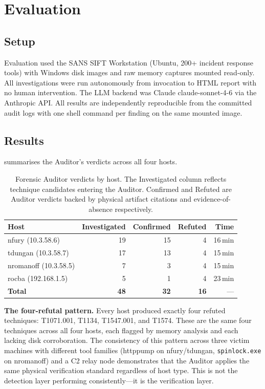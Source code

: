 \documentclass[sigconf, nonacm]{acmart}
\begin{document}
\section{Evaluation}
\label{sec:evaluation}

\subsection{Setup}

Evaluation used the SANS SIFT Workstation (Ubuntu, 200+ incident response tools)
with Windows disk images and raw memory captures mounted read-only. All
investigations were run autonomously from invocation to HTML report with no human
intervention. The LLM backend was Claude claude-sonnet-4-6 via the Anthropic API.
All results are independently reproducible from the committed audit logs with one
shell command per finding on the same mounted image.

\subsection{Results}

 summarises the Auditor's verdicts across all four hosts.

\begin{table}[h]
\centering
\caption{Forensic Auditor verdicts by host. The Investigated column reflects
technique candidates entering the Auditor. Confirmed and Refuted are Auditor
verdicts backed by physical artifact citations and evidence-of-absence
respectively.}
\label{tab:results}
\begin{tabular}{lrrrr}
\toprule
Host & Investigated & Confirmed & Refuted & Time \\
\midrule
nfury (10.3.58.6)     & 19 & 15 & 4 & 16\,min \\
tdungan (10.3.58.7)   & 17 & 13 & 4 & 15\,min \\
nromanoff (10.3.58.5) &  7 &  3 & 4 & 15\,min \\
rocba (192.168.1.5)   &  5 &  1 & 4 & 23\,min \\
\midrule
\textbf{Total}        & \textbf{48} & \textbf{32} & \textbf{16} & {---} \\
\bottomrule
\end{tabular}
\end{table}

\textbf{The four-refutal pattern.} Every host produced exactly four refuted
techniques: T1071.001, T1134, T1547.001, and T1574. These are the same four
techniques across all four hosts, each flagged by memory analysis and each
lacking disk corroboration. The consistency of this pattern across three victim
machines with different tool families (httppump on nfury/tdungan,
\texttt{spinlock.exe} on nromanoff) and a C2 relay node demonstrates that the
Auditor applies the same physical verification standard regardless of host type.
This is not the detection layer performing consistently---it is the verification
layer.
\end{document}

